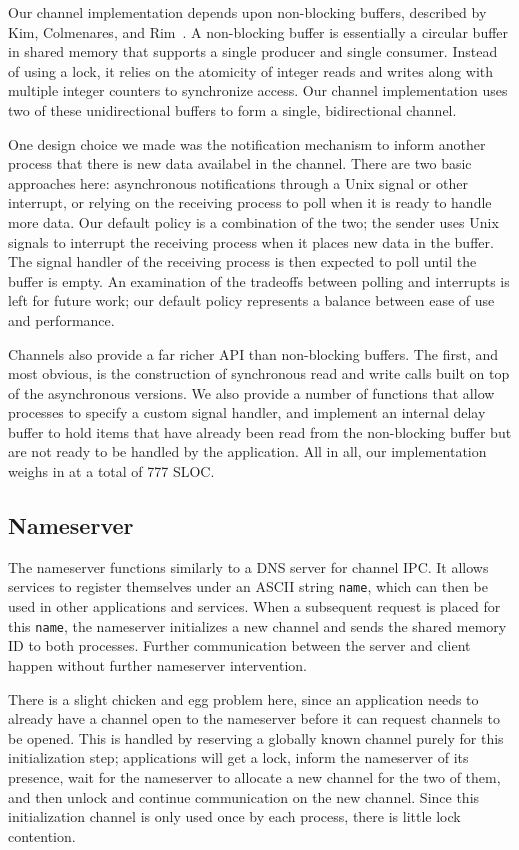 \documentclass[letterpaper,twocolumn,11pt]{article}
\begin{document}
Our channel implementation depends upon non-blocking buffers, described by Kim, Colmenares, and Rim~\cite{Kim:2007:EAN:1260991.1261857}. A non-blocking buffer is essentially a circular buffer in shared memory that supports a single producer and single consumer. Instead of using a lock, it relies on the atomicity of integer reads and writes along with multiple integer counters to synchronize access. Our channel implementation uses two of these unidirectional buffers to form a single, bidirectional channel.

One design choice we made was the notification mechanism to inform another process that there is new data availabel in the channel. There are two basic approaches here: asynchronous notifications through a Unix signal or other interrupt, or relying on the receiving process to poll when it is ready to handle more data. Our default policy is a combination of the two; the sender uses Unix signals to interrupt the receiving process when it places new data in the buffer. The signal handler of the receiving process is then expected to poll until the buffer is empty. An examination of the tradeoffs between polling and interrupts is left for future work; our default policy represents a balance between ease of use and performance.

Channels also provide a far richer API than non-blocking buffers. The first, and most obvious, is the construction of synchronous read and write calls built on top of the asynchronous versions. We also provide a number of functions that allow processes to specify a custom signal handler, and implement an internal delay buffer to hold items that have already been read from the non-blocking buffer but are not ready to be handled by the application. All in all, our implementation weighs in at a total of 777 SLOC.

\subsection{Nameserver}
The nameserver functions similarly to a DNS server for channel IPC. It allows services to register themselves under an ASCII string {\tt name}, which can then be used in other applications and services. When a subsequent request is placed for this {\tt name}, the nameserver initializes a new channel and sends the shared memory ID to both processes. Further communication between the server and client happen without further nameserver intervention.

There is a slight chicken and egg problem here, since an application needs to already have a channel open to the nameserver before it can request channels to be opened. This is handled by reserving a globally known channel purely for this initialization step; applications will get a lock, inform the nameserver of its presence, wait for the nameserver to allocate a new channel for the two of them, and then unlock and continue communication on the new channel. Since this initialization channel is only used once by each process, there is little lock contention.
\end{document}

